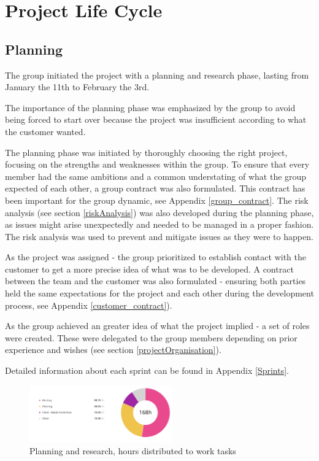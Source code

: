 
\chapter{Project Life Cycle}

\section{Planning}
The group initiated the project with a planning and research phase, lasting from January the 11th to February the 3rd. 

The importance of the planning phase was emphasized by the group to avoid being forced to start over because the project was insufficient according to what the customer wanted.

The planning phase was initiated by thoroughly choosing the right project, focusing on the strengths and weaknesses within the group. To ensure that every member had the same ambitions and a common understating of what the group expected of each other, a group contract was also formulated. This contract has been important for the group dynamic, see Appendix \ref{group_contract}. The risk analysis (see section \ref{riskAnalysis}) was also developed during the planning phase, as issues might arise unexpectedly and needed to be managed in a proper fashion. The risk analysis was used to prevent and mitigate issues as they were to happen.  

As the project was assigned - the group prioritized to establish contact with the customer to get a more precise idea of what was to be developed. A contract between the team and the customer was also formulated - ensuring both parties held the same expectations for the project and each other during the development process, see Appendix \ref{customer_contract}).

As the group achieved an greater idea of what the project implied - a set of roles were created. These were delegated to the group members depending on prior experience and wishes (see section \ref{projectOrganisation}).

Detailed information about each sprint can be found in Appendix \ref{Sprints}.

\begin{figure}[t]
\centering
    \includegraphics[width=0.55\textwidth]{fig/planning-and-research-diagram}
\caption{Planning and research, hours distributed to work tasks}
\end{figure}


